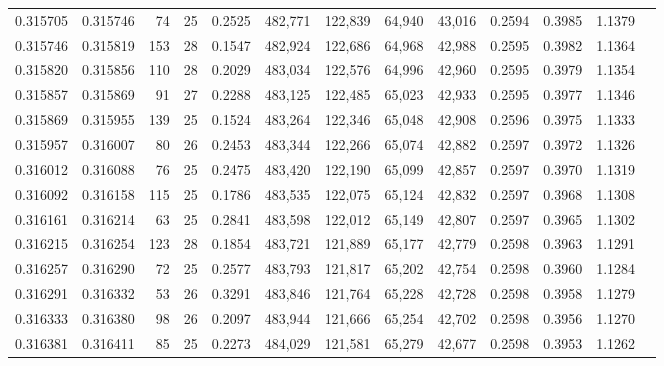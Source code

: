 \begin{tabular}{rrrrrrrrrrrrr}
0.315705 & 0.315746 &    74 &  25 &                                     0.2525 & 482,771 & 122,839 &  64,940 &  43,016 & 0.2594 & 0.3985 & 1.1379 \\
0.315746 & 0.315819 &   153 &  28 &                                     0.1547 & 482,924 & 122,686 &  64,968 &  42,988 & 0.2595 & 0.3982 & 1.1364 \\
0.315820 & 0.315856 &   110 &  28 &                                     0.2029 & 483,034 & 122,576 &  64,996 &  42,960 & 0.2595 & 0.3979 & 1.1354 \\
0.315857 & 0.315869 &    91 &  27 &                                     0.2288 & 483,125 & 122,485 &  65,023 &  42,933 & 0.2595 & 0.3977 & 1.1346 \\
0.315869 & 0.315955 &   139 &  25 &                                     0.1524 & 483,264 & 122,346 &  65,048 &  42,908 & 0.2596 & 0.3975 & 1.1333 \\
0.315957 & 0.316007 &    80 &  26 &                                     0.2453 & 483,344 & 122,266 &  65,074 &  42,882 & 0.2597 & 0.3972 & 1.1326 \\
0.316012 & 0.316088 &    76 &  25 &                                     0.2475 & 483,420 & 122,190 &  65,099 &  42,857 & 0.2597 & 0.3970 & 1.1319 \\
0.316092 & 0.316158 &   115 &  25 &                                     0.1786 & 483,535 & 122,075 &  65,124 &  42,832 & 0.2597 & 0.3968 & 1.1308 \\
0.316161 & 0.316214 &    63 &  25 &                                     0.2841 & 483,598 & 122,012 &  65,149 &  42,807 & 0.2597 & 0.3965 & 1.1302 \\
0.316215 & 0.316254 &   123 &  28 &                                     0.1854 & 483,721 & 121,889 &  65,177 &  42,779 & 0.2598 & 0.3963 & 1.1291 \\
0.316257 & 0.316290 &    72 &  25 &                                     0.2577 & 483,793 & 121,817 &  65,202 &  42,754 & 0.2598 & 0.3960 & 1.1284 \\
0.316291 & 0.316332 &    53 &  26 &                                     0.3291 & 483,846 & 121,764 &  65,228 &  42,728 & 0.2598 & 0.3958 & 1.1279 \\
0.316333 & 0.316380 &    98 &  26 &                                     0.2097 & 483,944 & 121,666 &  65,254 &  42,702 & 0.2598 & 0.3956 & 1.1270 \\
0.316381 & 0.316411 &    85 &  25 &                                     0.2273 & 484,029 & 121,581 &  65,279 &  42,677 & 0.2598 & 0.3953 & 1.1262 \\

\end{tabular}
